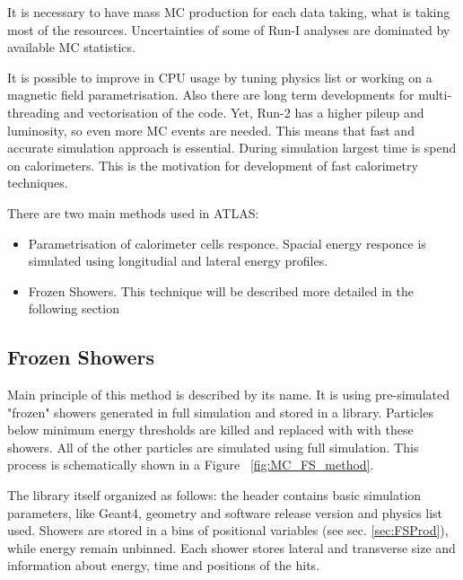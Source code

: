 It is necessary to have mass MC production for each data taking, what is taking most of the resources. Uncertainties of some of Run-I analyses are dominated by available MC statistics. 

It is possible to improve in CPU usage by tuning physics list or working on a magnetic field parametrisation. Also there are long term developments for multi-threading and vectorisation of the code. 
Yet, Run-2 has a higher pileup and luminosity, so even more MC events are needed. This means that fast and accurate simulation approach is essential. During simulation largest time is spend on calorimeters. This is the motivation for development of fast calorimetry techniques.  

There are two main methods used in ATLAS:
\begin{itemize}
\item Parametrisation of calorimeter cells responce. Spacial energy responce is simulated using longitudial and lateral energy profiles.
\item Frozen Showers. This technique will be described more detailed in the following section
\end{itemize}


\subsection{Frozen Showers}
Main principle of this method is described by its name. It is using pre-simulated "frozen" showers generated in full simulation and stored in a library. Particles below minimum energy
thresholds are killed and replaced with with these showers. All of the other particles are simulated using full simulation. This process is schematically shown in a Figure ~\ref{fig:MC_FS_method}.
\begin{figure}[t]
\end{figure}

The library itself organized as follows: the header contains basic simulation parameters, like Geant4, geometry and \atlas software release version and physics list used. Showers are stored in a bins of positional  variables (see sec. \ref{sec:FSProd}), while energy remain unbinned. Each shower stores lateral and transverse size and information about energy, time and positions of the hits.

